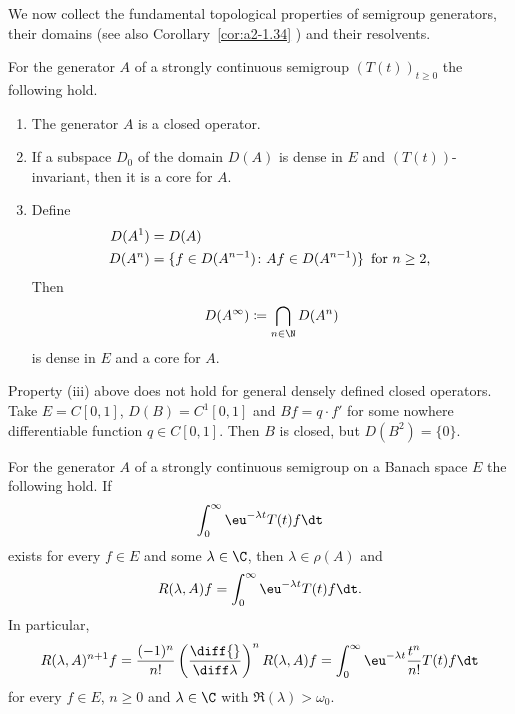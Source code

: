 We now collect the fundamental topological properties of semigroup generators, their domains (see also Corollary~\ref{cor:a2-1.34} ) and their resolvents.
\begin{proposition}\label{prop:a1-1.9}
For the generator $A$ of a strongly continuous semigroup $(T(t))_{t \geq 0}$ the following hold.
\begin{enumerate}[\upshape(i)]
\item 
The generator $A$ is a closed operator.

\item
If a subspace $D_{0}$ of the domain $D(A)$ is dense in $E$ and $(T(t))$-invariant, then it is a core for $A$.
\item Define 
%
\begin{align*}
	D(A^{1}) &= D(A) \\
	D(A^{n}) &= \{f \in D(A^{n-1}) \colon Af \in D(A^{n-1})\} \, \text{ for $ n \geq 2 $, }
\end{align*}
%
Then %
\[
	D(A^{\infty}) \coloneqq \bigcap_{n \in \N} D(A^{n})
\]
%
is dense in $E$ and a core for $A$.
\end{enumerate}
\end{proposition}
\begin{example}\label{ex:a1-1.10}
Property (iii) above does not hold for general densely defined closed operators.
Take $E = C\left[ 0,1 \right]$, $D(B) = C^{1}\left[ 0,1 \right]$ and $Bf = q \cdot f'$ for some nowhere differentiable function $q \in C\left[ 0,1 \right]$.
Then $B$ is closed, but $D(B^{2}) = \{0\}$.
\end{example}
\begin{proposition}\label{prop:a1-1.11}
For the generator $A$ of a strongly continuous semigroup on a Banach space $E$ the following hold.
If %
\[
	 \int_{0}^{\infty}  \eu^{-\lambda t}T(t)f \dt 
\]
%
exists for every $f \in E$ and some $\lambda \in \C$, then $\lambda \in \rho(A)$ and 
%
\[
	R(\lambda,A)f = \int_{0}^{\infty}  \eu^{-\lambda t}T(t)f  \dt.
\]
%
In particular,
\begin{equation}\label{eq:a1-1.7}
R(\lambda,A)^{n+1}f 
	= \frac{(-1)^{n}}{n!}\left(\frac{\diff{ }}{\diff\lambda}\right)^{n} R(\lambda,A)f 
	= \int_{0}^{\infty}  \eu^{-\lambda t}\frac{t^{n}}{n!}T(t)f  \dt
\end{equation}
for every $f \in E$, $n \geq 0$ and $\lambda \in \C$ with $\Re(\lambda) > \omega_{0}$.
\end{proposition}
